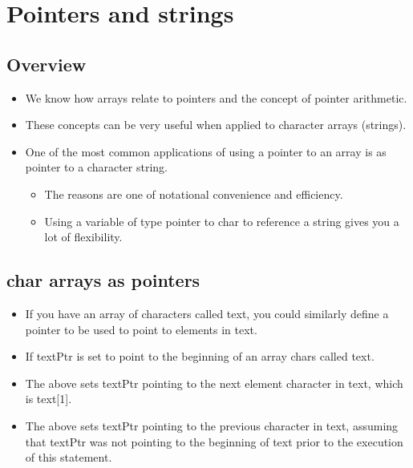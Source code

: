\section{Pointers and strings}
\subsection{Overview}
\begin{itemize}
    \item We know how arrays relate to pointers and the concept of pointer arithmetic. 
    \item These concepts can be very useful when applied to character arrays (strings).
    \item One of the most common applications of using a pointer to an array is as pointer to a character string. 
        \begin{itemize}
            \item The reasons are one of notational convenience and efficiency.
            \item Using a variable of type pointer to char to reference a string gives you a lot of flexibility. 
        \end{itemize}
\end{itemize}

\subsection{char arrays as pointers}
\begin{itemize}
    \item If you have an array of characters called text, you could similarly define a pointer to be used to point to elements in text. 
    \item If textPtr is set to point to the beginning of an array chars called text. 
    \item The above sets textPtr pointing to the next element character in text, which is text[1].
    \item The above sets textPtr pointing to the previous character in text, assuming that textPtr was not pointing to the beginning of text prior to the execution of this statement.
\end{itemize}


